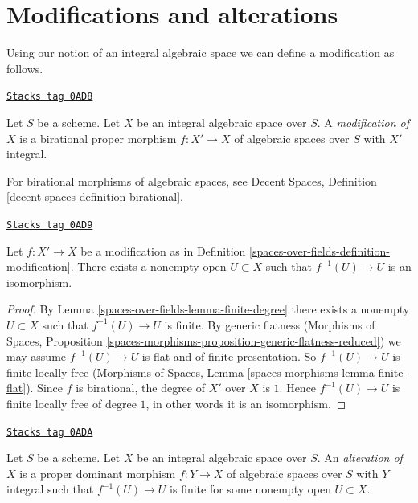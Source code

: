 \section{Modifications and alterations}
\label{spaces-over-fields-section-modifications-alterations}
Using our notion of an integral algebraic space we can define a modification
as follows.

\begin{definition}[Modification]
\label{spaces-over-fields-definition-modification}
\href{https://stacks.math.columbia.edu/tag/0AD8}{\texttt{Stacks tag 0AD8}}

Let $S$ be a scheme. Let $X$ be an integral algebraic space over $S$. A
{\it modification of $X$} is a birational proper morphism
$f : X' \to X$ of algebraic spaces over $S$ with $X'$ integral.
\end{definition}

For birational morphisms of algebraic spaces, see
Decent Spaces, Definition \ref{decent-spaces-definition-birational}.

\begin{lemma}
\label{spaces-over-fields-lemma-modification-iso-over-open}
\href{https://stacks.math.columbia.edu/tag/0AD9}{\texttt{Stacks tag 0AD9}}

Let $f : X' \to X$ be a modification as in
Definition \ref{spaces-over-fields-definition-modification}.
There exists a nonempty open $U \subset X$ such that $f^{-1}(U) \to U$
is an isomorphism.
\end{lemma}

\begin{proof}
By
Lemma \ref{spaces-over-fields-lemma-finite-degree} there exists a nonempty $U \subset X$ such
that $f^{-1}(U) \to U$ is finite. By generic flatness
(Morphisms of Spaces, Proposition
\ref{spaces-morphisms-proposition-generic-flatness-reduced})
we may assume $f^{-1}(U) \to U$ is flat and of finite presentation.
So $f^{-1}(U) \to U$ is finite locally free
(Morphisms of Spaces, Lemma \ref{spaces-morphisms-lemma-finite-flat}).
Since $f$ is birational, the degree of $X'$ over $X$ is $1$.
Hence $f^{-1}(U) \to U$ is finite locally free of degree $1$,
in other words it is an isomorphism.
\end{proof}

\begin{definition}[Alteration]
\label{spaces-over-fields-definition-alteration}
\href{https://stacks.math.columbia.edu/tag/0ADA}{\texttt{Stacks tag 0ADA}}

Let $S$ be a scheme. Let $X$ be an integral algebraic space over $S$.
An {\it alteration of $X$} is a proper dominant morphism $f : Y \to X$
of algebraic spaces over $S$ with $Y$ integral such that $f^{-1}(U) \to U$
is finite for some nonempty open $U \subset X$.
\end{definition}


